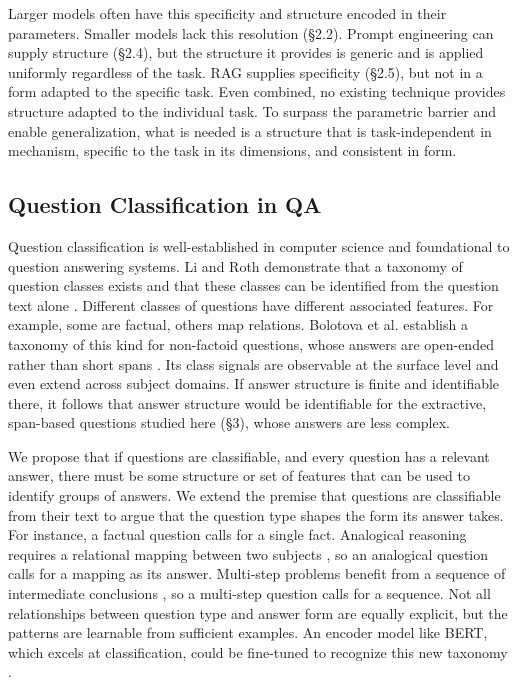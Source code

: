 \documentclass{article}
\begin{document}
Larger models often have this specificity and structure encoded in their parameters. Smaller models lack this resolution (\S2.2). Prompt engineering can supply structure (\S2.4), but the structure it provides is generic and is applied uniformly regardless of the task. RAG supplies specificity (\S2.5), but not in a form adapted to the specific task. Even combined, no existing technique provides structure adapted to the individual task. To surpass the parametric barrier and enable generalization, what is needed is a structure that is task-independent in mechanism, specific to the task in its dimensions, and consistent in form.

\subsection{Question Classification in QA}


Question classification is well-established in computer science and foundational to question answering systems. Li and Roth demonstrate that a taxonomy of question classes exists and that these classes can be identified from the question text alone \cite{liroth2002questions}. Different classes of questions have different associated features. For example, some are factual, others map relations. Bolotova et al. establish a taxonomy of this kind for non-factoid questions, whose answers are open-ended rather than short spans \cite{nonfactoid_taxonomy2022}. Its class signals are observable at the surface level and even extend across subject domains. If answer structure is finite and identifiable there, it follows that answer structure would be identifiable for the extractive, span-based questions studied here (\S3), whose answers are less complex.

We propose that if questions are classifiable, and every question has a relevant answer, there must be some structure or set of features that can be used to identify groups of answers. We extend the premise that questions are classifiable from their text \cite{liroth2002questions} to argue that the question type shapes the form its answer takes. For instance, a factual question calls for a single fact. Analogical reasoning requires a relational mapping between two subjects \cite{analogical_reasoning2022}, so an analogical question calls for a mapping as its answer. Multi-step problems benefit from a sequence of intermediate conclusions \cite{wei2022cot}, so a multi-step question calls for a sequence. Not all relationships between question type and answer form are equally explicit, but the patterns are learnable from sufficient examples. An encoder model like BERT, which excels at classification, could be fine-tuned to recognize this new taxonomy \cite{devlin2019bert, xu2019qc_bert}.
\end{document}
